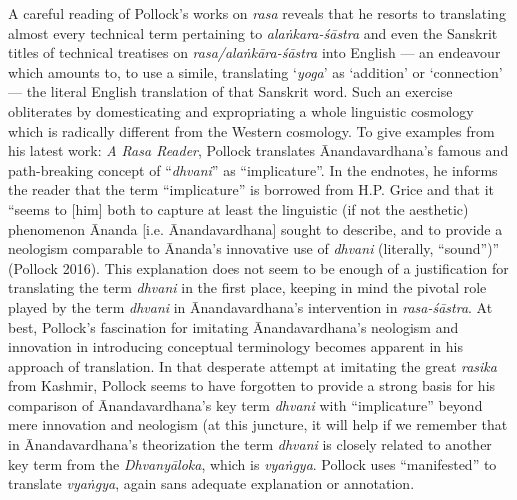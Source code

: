 A careful reading of Pollock’s works on \textsl{rasa} reveals that he resorts to translating almost every technical term pertaining to \textsl{alaṅkara-śāstra} and even the Sanskrit titles of technical treatises on \textsl{rasa/alaṅkāra-śāstra} into English --- an endeavour which amounts to, to use a simile, translating ‘\textsl{yoga}’ as ‘addition’ or ‘connection’ --- the literal English translation of that Sanskrit word. Such an exercise obliterates by domesticating and expropriating a whole linguistic cosmology which is radically different from the Western cosmology. To give examples from his latest work: \textsl{A Rasa Reader}, Pollock translates Ānandavardhana’s famous and path-breaking concept of “\textsl{dhvani}” as “implicature”. In the endnotes, he informs the reader that the term “implicature” is borrowed from H.P. Grice and that it “seems to [him] both to capture at least the linguistic (if not the aesthetic) phenomenon Ānanda [i.e. Ānandavardhana] sought to describe, and to provide a neologism comparable to Ānanda’s innovative use of \textsl{dhvani} (literally, “sound”)” (Pollock 2016). This explanation does not seem to be enough of a justification for translating the term \textsl{dhvani} in the first place, keeping in mind the pivotal role played by the term \textsl{dhvani} in Ānandavardhana’s intervention in \textsl{rasa-śāstra}. At best, Pollock’s fascination for imitating Ānandavardhana’s neologism and innovation in introducing conceptual terminology becomes apparent in his approach of translation. In that desperate attempt at imitating the great \textsl{rasika} from Kashmir, Pollock seems to have forgotten to provide a strong basis for his comparison of Ānandavardhana’s key term \textsl{dhvani} with “implicature” beyond mere innovation and neologism (at this juncture, it will help if we remember that in Ānandavardhana’s theorization the term \textsl{dhvani} is closely related to another key term from the \textsl{Dhvanyāloka}, which is \textsl{vyaṅgya}. Pollock uses “manifested” to translate \textsl{vyaṅgya}, again sans adequate explanation or annotation. 

